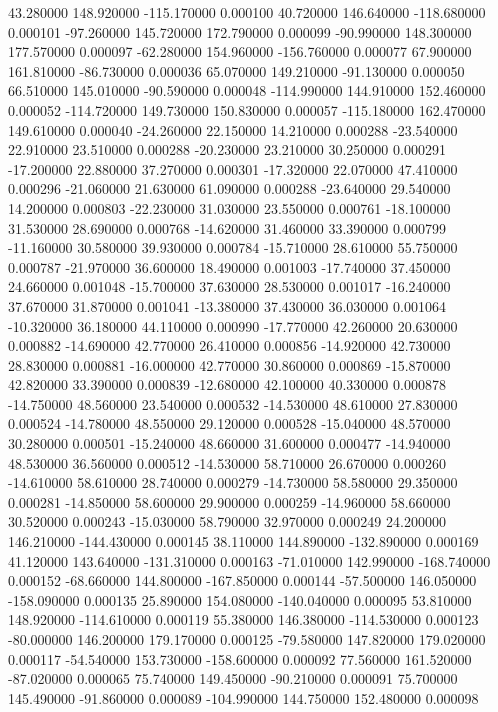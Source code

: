 43.280000 148.920000 -115.170000 0.000100 
40.720000 146.640000 -118.680000 0.000101 
-97.260000 145.720000 172.790000 0.000099 
-90.990000 148.300000 177.570000 0.000097 
-62.280000 154.960000 -156.760000 0.000077 
67.900000 161.810000 -86.730000 0.000036 
65.070000 149.210000 -91.130000 0.000050 
66.510000 145.010000 -90.590000 0.000048 
-114.990000 144.910000 152.460000 0.000052 
-114.720000 149.730000 150.830000 0.000057 
-115.180000 162.470000 149.610000 0.000040 
-24.260000 22.150000 14.210000 0.000288 
-23.540000 22.910000 23.510000 0.000288 
-20.230000 23.210000 30.250000 0.000291 
-17.200000 22.880000 37.270000 0.000301 
-17.320000 22.070000 47.410000 0.000296 
-21.060000 21.630000 61.090000 0.000288 
-23.640000 29.540000 14.200000 0.000803 
-22.230000 31.030000 23.550000 0.000761 
-18.100000 31.530000 28.690000 0.000768 
-14.620000 31.460000 33.390000 0.000799 
-11.160000 30.580000 39.930000 0.000784 
-15.710000 28.610000 55.750000 0.000787 
-21.970000 36.600000 18.490000 0.001003 
-17.740000 37.450000 24.660000 0.001048 
-15.700000 37.630000 28.530000 0.001017 
-16.240000 37.670000 31.870000 0.001041 
-13.380000 37.430000 36.030000 0.001064 
-10.320000 36.180000 44.110000 0.000990 
-17.770000 42.260000 20.630000 0.000882 
-14.690000 42.770000 26.410000 0.000856 
-14.920000 42.730000 28.830000 0.000881 
-16.000000 42.770000 30.860000 0.000869 
-15.870000 42.820000 33.390000 0.000839 
-12.680000 42.100000 40.330000 0.000878 
-14.750000 48.560000 23.540000 0.000532 
-14.530000 48.610000 27.830000 0.000524 
-14.780000 48.550000 29.120000 0.000528 
-15.040000 48.570000 30.280000 0.000501 
-15.240000 48.660000 31.600000 0.000477 
-14.940000 48.530000 36.560000 0.000512 
-14.530000 58.710000 26.670000 0.000260 
-14.610000 58.610000 28.740000 0.000279 
-14.730000 58.580000 29.350000 0.000281 
-14.850000 58.600000 29.900000 0.000259 
-14.960000 58.660000 30.520000 0.000243 
-15.030000 58.790000 32.970000 0.000249 
24.200000 146.210000 -144.430000 0.000145 
38.110000 144.890000 -132.890000 0.000169 
41.120000 143.640000 -131.310000 0.000163 
-71.010000 142.990000 -168.740000 0.000152 
-68.660000 144.800000 -167.850000 0.000144 
-57.500000 146.050000 -158.090000 0.000135 
25.890000 154.080000 -140.040000 0.000095 
53.810000 148.920000 -114.610000 0.000119 
55.380000 146.380000 -114.530000 0.000123 
-80.000000 146.200000 179.170000 0.000125 
-79.580000 147.820000 179.020000 0.000117 
-54.540000 153.730000 -158.600000 0.000092 
77.560000 161.520000 -87.020000 0.000065 
75.740000 149.450000 -90.210000 0.000091 
75.700000 145.490000 -91.860000 0.000089 
-104.990000 144.750000 152.480000 0.000098 
